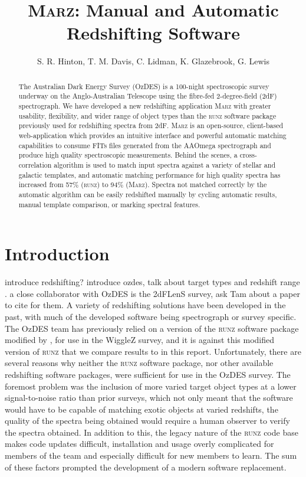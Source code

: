 \documentclass[iop]{emulateapj}
\newcommand{\red}{\color{red}}
\newcommand{\green}{\color{LimeGreen}}
\newcommand{\runz}{\textsc{runz}}
\newcommand{\marz}{\textsc{Marz}}
\begin{document}
\title{\marz{}: Manual and Automatic Redshifting Software}

\author{S. R. Hinton, T. M. Davis, C. Lidman, K. Glazebrook, G. Lewis}

\begin{abstract}
The Australian Dark Energy Survey (OzDES) is a 100-night spectroscopic survey underway on the Anglo-Australian Telescope using the fibre-fed 2-degree-field (2dF) spectrograph.  We have developed a new redshifting application \marz{} with greater usability, flexibility, and wider range of object types than the \runz{} software package previously used for redshifting spectra from 2dF. \marz{} is an open-source, client-based web-application which provides an intuitive interface and powerful automatic matching capabilities to consume FITs files generated from the AAOmega spectrograph and produce high quality spectroscopic measurements. Behind the scenes, a cross-correlation algorithm is used to match input spectra against a variety of stellar and galactic templates, and automatic matching performance for high quality spectra has increased from 57\% (\runz{}) to 94\% (\marz{}). Spectra not matched correctly by the automatic algorithm can be easily redshifted manually by cycling automatic results, manual template comparison, or marking spectral features.
\end{abstract}

\section{Introduction}


{\red introduce redshifting? introduce ozdes, talk about target types and redshift range} \cite{fang2015}. {\green a close collaborator with OzDES is the 2dFLenS survey, ask Tam about a paper to cite for them.}
A variety of redshifting solutions have been developed in the past, with much of the developed software being spectrograph or survey specific. The OzDES team has previously relied on a version of the \runz{} software package modified by \citet{saunders2004}, for use in the WiggleZ survey, and it is against this modified version of \runz{} that we compare results to in this report.  Unfortunately, there are several reasons why neither the \runz{} software package, nor other available redshifting software packages, were sufficient for use in the OzDES survey. The foremost problem was the inclusion of more varied target object types at a lower signal-to-noise ratio than prior surveys, which not only meant that the software would have to be capable of matching exotic objects at varied redshifts, the quality of the spectra being obtained would require a human observer to verify the spectra obtained. In addition to this, the legacy nature of the \runz{} code base makes code updates difficult, installation and usage overly complicated for members of the team and especially difficult for new members to learn. The sum of these factors prompted the development of a modern software replacement.\\
\end{document}
